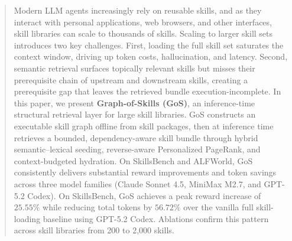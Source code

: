 \begin{abstract}
Modern LLM agents increasingly rely on reusable skills, and as they interact with personal applications, web browsers, and other interfaces, skill libraries can scale to thousands of skills.
%
Scaling to larger skill sets introduces two key challenges. First, loading the full skill set saturates the context window, driving up token costs, hallucination, and latency. Second, semantic retrieval surfaces topically relevant skills but misses their prerequisite chain of upstream and downstream skills, creating a prerequisite gap that leaves the retrieved bundle execution-incomplete.
%
%
In this paper, we present \textbf{Graph-of-Skills (GoS)}, an inference-time structural retrieval layer for large skill libraries.
%
GoS constructs an executable skill graph offline from skill packages, then at inference time retrieves a bounded, dependency-aware skill bundle through hybrid semantic--lexical seeding, reverse-aware Personalized PageRank, and context-budgeted hydration.
%
On SkillsBench and ALFWorld, GoS consistently delivers substantial reward improvements and token savings across three model families (Claude Sonnet 4.5, MiniMax M2.7, and GPT-5.2 Codex). 
%
On SkillsBench, GoS achieves a peak reward increase of $25.55\%$ while reducing total tokens by $56.72\%$ over the vanilla full skill-loading baseline using GPT-5.2 Codex.
%
Ablations confirm this pattern across skill libraries from 200 to 2{,}000 skills.
%

\end{abstract}
